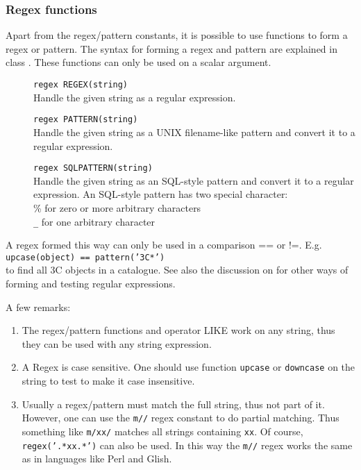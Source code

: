 \subsubsection{\label{TAQL:REGEX}Regex functions}
Apart from the regex/pattern constants, it is possible to use
functions to form a regex or pattern.
The syntax for forming a regex and pattern are explained in class
.
These functions can only be used on a scalar argument.

\begin{description}
  \item[] \texttt{regex REGEX(string)}\\
       Handle the given string as a regular expression.
  \item[] \texttt{regex PATTERN(string)}\\
       Handle the given string as a UNIX filename-like pattern and
       convert it to a regular expression.
  \item[] \texttt{regex SQLPATTERN(string)}\\
       Handle the given string as an SQL-style pattern and
       convert it to a regular expression.
       An SQL-style pattern has two special character:
       \\ \% for zero or more arbitrary characters
       \\ \verb+_+ for one arbitrary character
\end{description}
A regex formed this way can only be used in a comparison == or !=. E.g.
\\\texttt{upcase(object) == pattern('3C*')}
\\to find all 3C objects in a catalogue.
See also the discussion on  for
other ways of forming and testing regular expressions.

A few remarks:
\begin{enumerate}
\item The regex/pattern functions and operator LIKE work on any string,
thus they can be used with any string expression.
\item A Regex is case sensitive. One should use 
function \texttt{upcase} or \texttt{downcase} on the string to test to
make it case insensitive. 
\item Usually a regex/pattern must match the full string, thus not part of
it. However, one can use the \texttt{m//} regex constant to do partial
matching. Thus something like \texttt{m/xx/} matches all strings
containing \texttt{xx}. Of course, \texttt{regex('.*xx.*')} can also be used.
In this way the \texttt{m//} regex works the same as in languages like
Perl and Glish. 
\end{enumerate}


